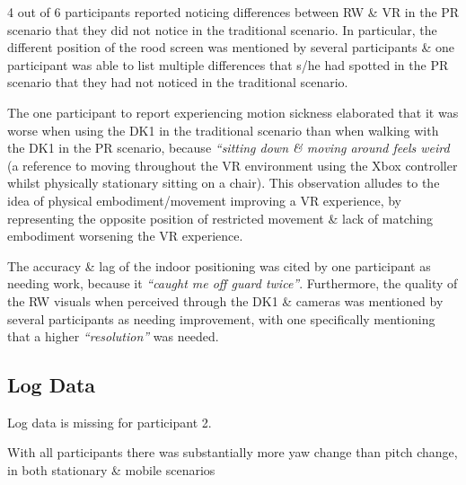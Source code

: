 4 out of 6 participants reported noticing differences between RW \& VR in the PR scenario that they did not notice in the traditional scenario. In particular, the different position of the rood screen was mentioned by several participants \& one participant was able to list multiple differences that s/he had spotted in the PR scenario that they had not noticed in the traditional scenario.

The one participant to report experiencing motion sickness elaborated that it was worse when using the DK1 in the traditional scenario than when walking with the DK1 in the PR scenario, because \textit{``sitting down \& moving around feels weird} (a reference to moving throughout the VR environment using the Xbox controller whilst physically stationary sitting on a chair). This observation alludes to the idea of physical embodiment/movement improving a VR experience, by representing the opposite position of restricted movement \& lack of matching embodiment worsening the VR experience.

The accuracy \& lag of the indoor positioning was cited by one participant as needing work, because it \textit{``caught me off guard twice''}. Furthermore, the quality of the RW visuals when perceived through the DK1 \& cameras was mentioned by several participants as needing improvement, with one specifically mentioning that a higher \textit{``resolution''} was needed.


\subsection{Log Data}

Log data is missing for participant 2.


With all participants there was substantially more yaw change than pitch change, in both stationary \& mobile scenarios



